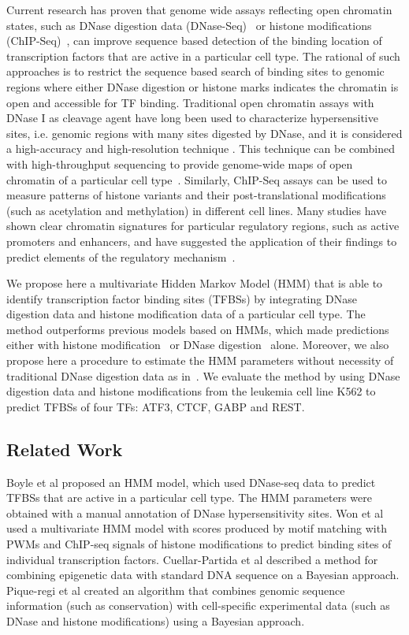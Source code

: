 \documentclass[runningheads,a4paper]{llncs}
\begin{document}
Current research has proven that genome wide assays reflecting open
chromatin states, such as DNase digestion data
(DNase-Seq)~\cite{boyle2011,cuellar2012} or histone modifications
(ChIP-Seq)~\cite{hon2009}, can improve sequence based detection of the
binding location of transcription factors that are active in a
particular cell type. The rational of such approaches is to restrict
the sequence based search of binding sites to genomic regions where
either DNase digestion or histone marks indicates the chromatin is
open and accessible for TF binding. Traditional open chromatin assays
with DNase I as cleavage agent have long been used to characterize
hypersensitive sites, i.e. genomic regions with many sites digested by
DNase, and it is considered a high-accuracy and high-resolution
technique \cite{gross1988}. This technique can be combined with
high-throughput sequencing to provide genome-wide maps of open
chromatin of a particular cell type~\cite{crawford2004}.  Similarly,
ChIP-Seq assays can be used to measure patterns of histone variants
and their post-translational modifications (such as acetylation and
methylation) in different cell lines. Many studies have shown clear
chromatin signatures for particular regulatory regions, such as active
promoters and enhancers, and have suggested the application of their
findings to predict elements of the regulatory
mechanism~\cite{cuellar2012,hon2009,barski2007}.

We propose here a multivariate Hidden Markov Model (HMM) that is able
to identify transcription factor binding sites (TFBSs) by integrating
DNase digestion data and histone modification data of a particular
cell type. The method outperforms previous models based on HMMs, which
made predictions either with histone modification~\cite{hon2009} or
DNase digestion~\cite{boyle2011} alone.  Moreover, we also propose
here a procedure to estimate the HMM parameters without necessity of traditional
DNase digestion data as in~\cite{boyle2011}. We evaluate the
method by using DNase digestion data and histone modifications from
the leukemia cell line K562 to predict TFBSs of four TFs: ATF3, CTCF,
GABP and REST.

\subsection{Related Work}

Boyle et al \cite{boyle2011} proposed an HMM model, which used DNase-seq data
to predict TFBSs that are active in a particular cell type. The HMM parameters were obtained
with a manual annotation of DNase hypersensitivity sites. Won et al
\cite{won2010} used a multivariate HMM model with scores produced by
motif matching with PWMs and ChIP-seq signals of histone modifications
to predict binding sites of individual transcription factors. Cuellar-Partida et al \cite{cuellar2012} 
described a method for combining epigenetic data with standard DNA sequence on a Bayesian approach. 
Pique-regi et al \cite{pique2011} created an
algorithm that combines genomic sequence information (such as
conservation) with cell-specific experimental data (such as DNase and
histone modifications) using a Bayesian approach.
\end{document}

